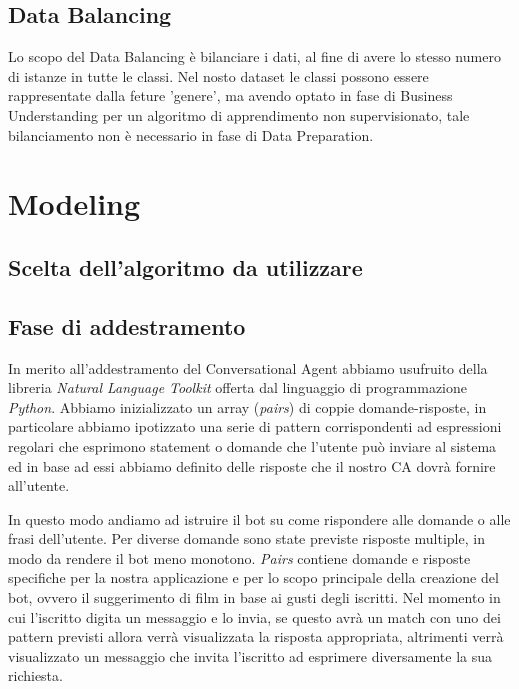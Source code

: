 \documentclass[a4paper, 10pt]{report}
\begin{document}
        \section{Data Balancing}\label{sec:data-balancing}
            Lo scopo del Data Balancing è bilanciare i dati, al fine di avere lo stesso numero di istanze in tutte le classi.
            Nel nosto dataset le classi possono essere rappresentate dalla feture 'genere', ma avendo optato in fase di
            Business Understanding per un algoritmo di apprendimento non supervisionato, tale bilanciamento non è necessario
            in fase di Data Preparation.


    \chapter{Modeling}\label{ch:modeling}


        \section{Scelta dell'algoritmo da utilizzare}\label{sec:scelta-dell'algoritmo-da-utilizzare}


        \section{Fase di addestramento}\label{sec:fase-di-addestramento}

            In merito all'addestramento del Conversational Agent abbiamo usufruito della libreria \textit{Natural Language Toolkit}
            offerta dal linguaggio di programmazione \textit{Python}. Abbiamo inizializzato un array (\textit{pairs}) di coppie domande-risposte,
            in particolare abbiamo ipotizzato una serie di pattern corrispondenti ad espressioni regolari che esprimono statement o domande che
            l'utente può inviare al sistema ed in base ad essi abbiamo definito delle risposte che il nostro CA dovrà fornire all'utente.

            In questo modo andiamo ad istruire il bot su come rispondere alle domande o alle frasi dell'utente. Per diverse domande
            sono state previste risposte multiple, in modo da rendere il bot meno monotono.
            \textit{Pairs} contiene domande e risposte specifiche per la nostra applicazione e per lo scopo
            principale della creazione del bot, ovvero il suggerimento di film in base ai gusti degli iscritti.
            Nel momento in cui l'iscritto digita un messaggio e lo invia, se questo avrà un match con uno dei pattern previsti allora
            verrà visualizzata la risposta appropriata, altrimenti verrà visualizzato un messaggio che invita l'iscritto
            ad esprimere diversamente la sua richiesta.
\end{document}
